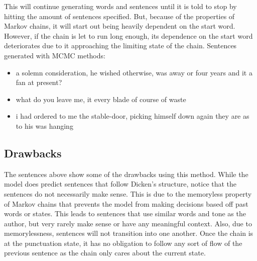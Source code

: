 \documentclass[9pt,twocolumn,twoside]{idsi}
\begin{document}
This will continue generating words and sentences until it is told to stop by hitting the amount of sentences specified. But, because of the properties of Markov chains, it will start out being heavily dependent on the start word. However, if the chain is let to run long enough, its dependence on the start word deteriorates due to it approaching the limiting state of the chain.
\linebreak
\linebreak
Sentences generated with MCMC methods: 
\begin{itemize}
\item a solemn consideration, he wished otherwise, was away or four years and it a fan at present?
\item what do you leave me, it every blade of course of waste
\item i had ordered to me the stable-door, picking himself down again they are as to his was hanging
\end{itemize}

\subsection{Drawbacks}
The sentences above show some of the drawbacks using this method. While the model does predict sentences that follow Dicken's structure, notice that the sentences do not necessarily make sense. This is due to the memoryless property of Markov chains that prevents the model from making decisions based off past words or states. This leads to sentences that use similar words and tone as the author, but very rarely make sense or have any meaningful context. Also, due to memorylessness, sentences will not transition into one another. Once the chain is at the punctuation state, it has no obligation to follow any sort of flow of the previous sentence as the chain only cares about the current state. 
\end{document}
